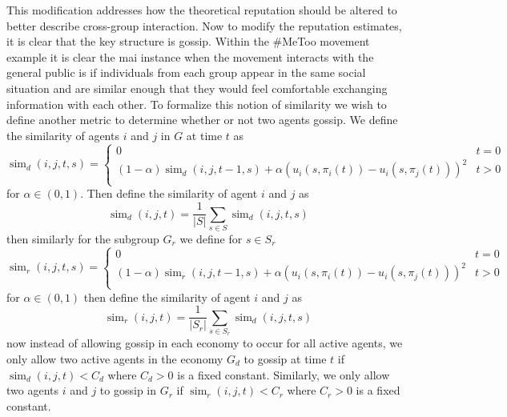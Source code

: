 \documentclass[12pt]{article}
\begin{document}
This modification addresses how the theoretical reputation should be altered to better describe cross-group interaction.
Now to modify the reputation estimates, it is clear that the key structure is gossip. Within the \#MeToo movement example
it is clear the mai instance when the movement interacts with the general public is if individuals
from each group appear in the same social situation and are similar enough that they would feel comfortable exchanging information with each other.
To formalize this notion of similarity we wish to define another metric to determine whether or not two agents gossip.
We define the similarity of agents $i$ and $j$ in $G$ at time $t$
as
\[ \operatorname{sim}_d(i, j, t, s) = \begin{cases}
    0 & t = 0 \\
    (1 - \alpha)\operatorname{sim}_d(i, j, t-1, s) + \alpha(u_i(s, \pi_i(t)) - u_i(s, \pi_j(t)))^2 & t > 0 \\
\end{cases} \]
for $\alpha \in (0, 1)$.
Then define the similarity of agent $i$ and $j$ as
\[ \operatorname{sim}_d(i, j, t) = \frac{1}{|S|}\sum_{s \in S}\operatorname{sim}_d(i, j, t, s) \]
then similarly for the subgroup $G_r$ we define for $s \in S_r$
\[ \operatorname{sim}_r(i, j, t, s) = \begin{cases}
    0 & t = 0 \\
    (1 - \alpha)\operatorname{sim}_r(i, j, t-1, s) + \alpha(u_i(s, \pi_i(t)) - u_i(s, \pi_j(t)))^2 & t > 0 \\
\end{cases} \]
for $\alpha \in (0, 1)$
then define the similarity of agent $i$ and $j$ as
\[ \operatorname{sim}_r(i, j, t) = \frac{1}{|S_r|}\sum_{s \in S_r}\operatorname{sim}_d(i, j, t, s) \]
now instead of allowing gossip in each economy to occur for all active agents,
we only allow two active agents in the economy $G_d$ to gossip at time $t$
if $\operatorname{sim}_d(i, j, t) < C_d$ where $C_d > 0$ is a fixed constant. Similarly, we only allow two agents $i$ and $j$
to gossip in $G_r$ if $\operatorname{sim}_r(i, j, t) < C_r$ where $C_r > 0$ is a fixed constant.
\end{document}
